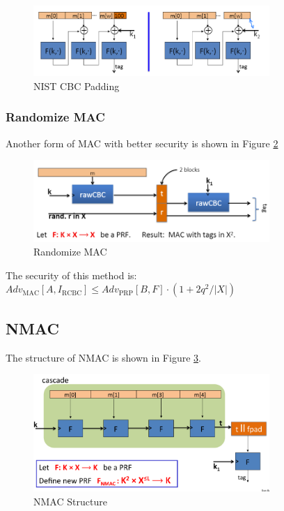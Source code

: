 \begin{figure}[h]
    \centering
    \includegraphics[width=0.8\textwidth]{Stanford_Crypto_1/fig/04_Integrity/NIST CBC Padding.png}
    \caption{NIST CBC Padding}
    \label{fig: Lecture 4: NIST CBC Padding}
\end{figure}

\subsubsection{Randomize MAC}

Another form of MAC with better security is shown in Figure \ref{fig: Lecture 4: Randomize MAC}

\begin{figure}[h]
    \centering
    \includegraphics[width=0.8\textwidth]{Stanford_Crypto_1/fig/04_Integrity/Randomize MAC.png}
    \caption{Randomize MAC}
    \label{fig: Lecture 4: Randomize MAC}
\end{figure}

The security of this method is:  $A d v_{\mathrm{MAC}}\left[A, I_{\mathrm{RCBC}}\right] \leq A d v_{\mathrm{PRP}}[B, F] \cdot\left(1+2 q^{2} /|X|\right)$


\subsection{NMAC}

The structure of NMAC is shown in Figure \ref{fig: Lecture 4: NMAC Structure}.

\begin{figure}[h]
    \centering
    \includegraphics[width=0.8\textwidth]{Stanford_Crypto_1/fig/04_Integrity/NMAC Structure.png}
    \caption{NMAC Structure}
    \label{fig: Lecture 4: NMAC Structure}
\end{figure}

